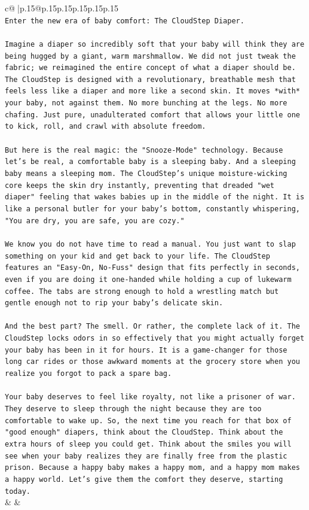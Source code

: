 \documentclass{article}
\begin{document}
{\begin{supertabular}{c@{$\;$}|p{.15\linewidth}@{}p{.15\linewidth}p{.15\linewidth}p{.15\linewidth}p{.15\linewidth}p{.15\linewidth}}
{{{\\ 
\texttt{Enter the new era of baby comfort: The CloudStep Diaper.} \\
\\ 
\texttt{Imagine a diaper so incredibly soft that your baby will think they are being hugged by a giant, warm marshmallow. We did not just tweak the fabric; we reimagined the entire concept of what a diaper should be. The CloudStep is designed with a revolutionary, breathable mesh that feels less like a diaper and more like a second skin. It moves *with* your baby, not against them. No more bunching at the legs. No more chafing. Just pure, unadulterated comfort that allows your little one to kick, roll, and crawl with absolute freedom.} \\
\\ 
\texttt{But here is the real magic: the "Snooze{-}Mode" technology. Because let's be real, a comfortable baby is a sleeping baby. And a sleeping baby means a sleeping mom. The CloudStep's unique moisture{-}wicking core keeps the skin dry instantly, preventing that dreaded "wet diaper" feeling that wakes babies up in the middle of the night. It is like a personal butler for your baby's bottom, constantly whispering, "You are dry, you are safe, you are cozy."} \\
\\ 
\texttt{We know you do not have time to read a manual. You just want to slap something on your kid and get back to your life. The CloudStep features an "Easy{-}On, No{-}Fuss" design that fits perfectly in seconds, even if you are doing it one{-}handed while holding a cup of lukewarm coffee. The tabs are strong enough to hold a wrestling match but gentle enough not to rip your baby's delicate skin.} \\
\\ 
\texttt{And the best part? The smell. Or rather, the complete lack of it. The CloudStep locks odors in so effectively that you might actually forget your baby has been in it for hours. It is a game{-}changer for those long car rides or those awkward moments at the grocery store when you realize you forgot to pack a spare bag.} \\
\\ 
\texttt{Your baby deserves to feel like royalty, not like a prisoner of war. They deserve to sleep through the night because they are too comfortable to wake up. So, the next time you reach for that box of "good enough" diapers, think about the CloudStep. Think about the extra hours of sleep you could get. Think about the smiles you will see when your baby realizes they are finally free from the plastic prison. Because a happy baby makes a happy mom, and a happy mom makes a happy world. Let's give them the comfort they deserve, starting today.} \\
            }
        }
    }
    & & \\ \\


\end{supertabular}}
\end{document}
